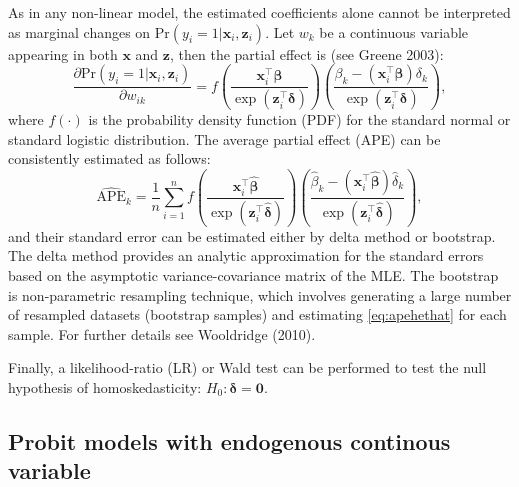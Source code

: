 As in any non-linear model, the estimated coefficients alone cannot be interpreted as marginal changes on \(\textrm{Pr}(y_i = 1|\mathbf x_i, \mathbf z_i)\). Let \(w_k\) be a continuous variable appearing in both \(\mathbf x\) and \(\mathbf z\), then the partial effect is (see Greene 2003):
\begin{equation}
    \frac{\partial \textrm{Pr}(y_i = 1| \mathbf x_i, \mathbf z_i)}{\partial w_{ik}} = f\left(\frac{\mathbf x_i^\top\boldsymbol \beta}{\exp\left(\mathbf z_i^\top\boldsymbol \delta\right)}\right)\left(\frac{\beta_k - (\mathbf x_i^\top\boldsymbol \beta)\delta_k}{\exp\left(\mathbf z_i^\top\boldsymbol \delta\right)}\right),
    \label{eq:apehet}
\end{equation}
where \(f(\cdot)\) is the probability density function (PDF) for the standard normal or standard logistic distribution. The average partial effect (APE) can be consistently estimated as follows:
\begin{equation}
  \widehat{\textrm{APE}}_k = \frac{1}{n}\sum_{i = 1}^nf\left(\frac{\mathbf x_i^\top\widehat{\boldsymbol \beta}}{\exp\left(\mathbf z_i^\top\widehat{\boldsymbol \delta}\right)}\right)\left(\frac{\widehat{\beta}_k - (\mathbf x_i^\top\widehat{\boldsymbol \beta})\widehat{\delta}_k}{\exp\left(\mathbf z_i^\top\widehat{\boldsymbol \delta}\right)}\right),
  \label{eq:apehethat}
\end{equation}
and their standard error can be estimated either by delta method or bootstrap. The delta method provides an analytic approximation for the standard errors based on the asymptotic variance-covariance matrix of the MLE. The bootstrap is non-parametric resampling technique, which involves generating a large number of resampled datasets (bootstrap samples) and estimating \eqref{eq:apehethat} for each sample. For further details see Wooldridge (2010).

Finally, a likelihood-ratio (LR) or Wald test can be performed to test the null hypothesis of homoskedasticity: \(H_0: \boldsymbol \delta= \boldsymbol{0}\).

\hypertarget{probit-models-with-endogenous-continous-variable}{%
\subsection{Probit models with endogenous continous variable}\label{probit-models-with-endogenous-continous-variable}}

